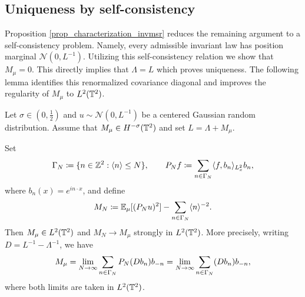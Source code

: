 \subsection{Uniqueness by self-consistency}
Proposition \ref{prop_characterization_invmsr} reduces the remaining
argument to a self-consistency problem.  Namely, every admissible invariant law
has position marginal $\mathcal N(0,L^{-1})$. Utilizing this self-consistency relation we show that $M_\mu = 0$. This directly implies that $\Lambda = L$ which proves uniqueness. 
The following lemma identifies this
renormalized covariance diagonal and improves the regularity of
$M_\mu$ to $L^2(\T^2)$. 


\begin{lemma}\label{lem:renormalized_variance_convergence}
    Let $\sigma \in (0, \frac 12)$ and $u \sim \mathcal{N}(0, L^{-1})$ be a centered Gaussian random distribution. Assume that $M_\mu \in H^{-\sigma}(\T^2)$ and set $L = \Lambda + M_\mu$.

    Set
    \[
        \Gamma_N
        \coloneqq
        \{n\in\Z^2:\langle n\rangle\leq N\},
        \qquad
        \P_Nf
        \coloneqq
        \sum_{n\in\Gamma_N}
        \langle f,b_n\rangle_{L^2_x}b_n,
    \]
    where \(b_n(x)=e^{in\cdot x}\), and define
    \[
        M_N
        \coloneqq
        \mathbb E_\mu[(\P_Nu)^2]
        -
        \sum_{n\in\Gamma_N}\langle n\rangle^{-2}.
    \]
    Then $M_\mu\in L^2(\T^2)$ and
    $M_N\to M_\mu$ strongly in $L^2(\T^2)$.
    More precisely, writing $D=L^{-1}-\Lambda^{-1}$, we have
    \begin{equation}\label{eq:M_mu_expansion}
        M_\mu
        =
        \lim_{N\to\infty}
        \sum_{n\in\Gamma_N}\P_N(Db_n)b_{-n}
        =
        \lim_{N\to\infty}
        \sum_{n\in\Gamma_N}(Db_n)b_{-n},
    \end{equation}
    where both limits are taken in $L^2(\T^2)$.
\end{lemma}

